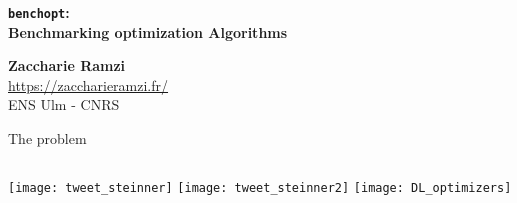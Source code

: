 \documentclass[unknownkeysallowed]{beamer}
\begin{document}


\begin{frame}
\bigskip
\bigskip
\begin{center}{
\LARGE\color{marron}
\textbf{\texttt{benchopt}:\\
		Benchmarking optimization Algorithms}
\textbf{ }\\
\vspace{0.5cm}
}

\color{marron}
\end{center}

\vspace{0.5cm}

\begin{center}
\textbf{Zaccharie Ramzi} \\
\vspace{0.1cm}
\url{https://zaccharieramzi.fr/}\\
\vspace{0.5cm}
ENS Ulm - CNRS \\
\end{center}

\centering

\end{frame}


\begin{frame}[fragile]{The problem}

    \begin{columns}
        \texttt{[image: tweet\_steinner]}
        \texttt{[image: tweet\_steinner2]}
            \texttt{[image: DL\_optimizers]}
    \end{columns}

\end{frame}
\end{document}
